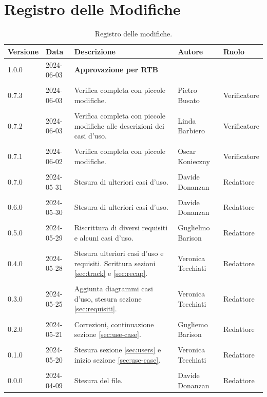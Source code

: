 \documentclass[8pt]{article}
\begin{document}
\section*{Registro delle Modifiche}
\begin{table}[ht!]
\hypersetup{hidelinks}
	\centering
	\begin{tabular}{p{1.2cm} p{2cm} p{6cm} p{3cm} p{2cm}}
		\toprule
		\textbf{Versione}& \textbf{Data} & \textbf{Descrizione} & \textbf{Autore} & \textbf{Ruolo} \\
		\midrule
  		    1.0.0 & 2024-06-03 & \textbf{Approvazione per RTB} & & \\\\
            0.7.3 & 2024-06-03 & Verifica completa con piccole modifiche. & Pietro Busato & Verificatore \\\\
            0.7.2 & 2024-06-03 & Verifica completa con piccole modifiche alle descrizioni dei casi d'uso. & Linda Barbiero & Verificatore \\\\
            0.7.1 & 2024-06-02 & Verifica completa con piccole modifiche. & Oscar Konieczny & Verificatore \\\\
         	0.7.0 & 2024-05-31 & Stesura di ulteriori casi d'uso. & Davide Donanzan & Redattore \\\\
         	0.6.0 & 2024-05-30 & Stesura di ulteriori casi d'uso. & Davide Donanzan & Redattore \\\\
         	0.5.0 & 2024-05-29 & Riscrittura di diversi requisiti e alcuni casi d'uso. & Guglielmo Barison & Redattore \\\\
            0.4.0 & 2024-05-28 & Stesura ulteriori casi d'uso e requisiti. Scrittura sezioni \ref{sec:track} e \ref{sec:recap}. & Veronica Tecchiati & Redattore \\\\
            0.3.0 & 2024-05-25 & Aggiunta diagrammi casi d'uso, stesura sezione \ref{sec:requisiti}. & Veronica Tecchiati & Redattore \\\\
            0.2.0 & 2024-05-21 & Correzioni, continuazione sezione \ref{sec:use-case}. & Gugliemo Barison & Redattore \\\\
            0.1.0 & 2024-05-20 & Stesura sezione \ref{sec:users} e inizio sezione \ref{sec:use-case}. & Veronica Tecchiati & Redattore \\\\
		    0.0.0 & 2024-04-09 & Stesura del file. & Davide Donanzan & Redattore \\
		\bottomrule
	\end{tabular}
	\caption{Registro delle modifiche.}
	\label{table:Registro delle modifiche}
\end{table}
\newpage
{\hypersetup{hidelinks} \tableofcontents}
\clearpage
\newpage
{\hypersetup{hidelinks} \listoffigures}
\newpage
{\hypersetup{hidelinks} \listoftables}
\newpage
\justifying
\end{document}
